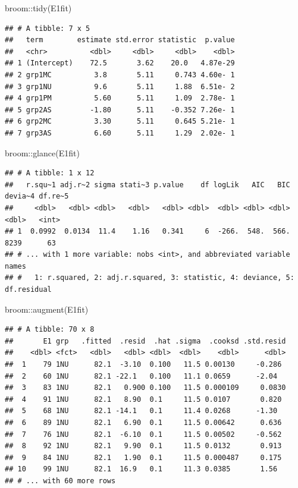 \documentclass[
]{book}
\newenvironment{Shaded}{\begin{snugshade}}{\end{snugshade}}
\newcommand{\FunctionTok}[1]{\textcolor[rgb]{0.00,0.00,0.00}{#1}}
\newcommand{\NormalTok}[1]{#1}
\newcommand{\SpecialCharTok}[1]{\textcolor[rgb]{0.00,0.00,0.00}{#1}}
\begin{document}
\begin{Shaded}
\begin{Highlighting}[]
\NormalTok{broom}\SpecialCharTok{::}\FunctionTok{tidy}\NormalTok{(E1fit)}
\end{Highlighting}
\end{Shaded}

\begin{verbatim}
## # A tibble: 7 x 5
##   term        estimate std.error statistic  p.value
##   <chr>          <dbl>     <dbl>     <dbl>    <dbl>
## 1 (Intercept)    72.5       3.62    20.0   4.87e-29
## 2 grp1MC          3.8       5.11     0.743 4.60e- 1
## 3 grp1NU          9.6       5.11     1.88  6.51e- 2
## 4 grp1PM          5.60      5.11     1.09  2.78e- 1
## 5 grp2AS         -1.80      5.11    -0.352 7.26e- 1
## 6 grp2MC          3.30      5.11     0.645 5.21e- 1
## 7 grp3AS          6.60      5.11     1.29  2.02e- 1
\end{verbatim}

\begin{Shaded}
\begin{Highlighting}[]
\NormalTok{broom}\SpecialCharTok{::}\FunctionTok{glance}\NormalTok{(E1fit)}
\end{Highlighting}
\end{Shaded}

\begin{verbatim}
## # A tibble: 1 x 12
##   r.squ~1 adj.r~2 sigma stati~3 p.value    df logLik   AIC   BIC devia~4 df.re~5
##     <dbl>   <dbl> <dbl>   <dbl>   <dbl> <dbl>  <dbl> <dbl> <dbl>   <dbl>   <int>
## 1  0.0992  0.0134  11.4    1.16   0.341     6  -266.  548.  566.    8239      63
## # ... with 1 more variable: nobs <int>, and abbreviated variable names
## #   1: r.squared, 2: adj.r.squared, 3: statistic, 4: deviance, 5: df.residual
\end{verbatim}

\begin{Shaded}
\begin{Highlighting}[]
\NormalTok{broom}\SpecialCharTok{::}\FunctionTok{augment}\NormalTok{(E1fit)}
\end{Highlighting}
\end{Shaded}

\begin{verbatim}
## # A tibble: 70 x 8
##       E1 grp   .fitted  .resid  .hat .sigma  .cooksd .std.resid
##    <dbl> <fct>   <dbl>   <dbl> <dbl>  <dbl>    <dbl>      <dbl>
##  1    79 1NU      82.1  -3.10  0.100   11.5 0.00130     -0.286 
##  2    60 1NU      82.1 -22.1   0.100   11.1 0.0659      -2.04  
##  3    83 1NU      82.1   0.900 0.100   11.5 0.000109     0.0830
##  4    91 1NU      82.1   8.90  0.1     11.5 0.0107       0.820 
##  5    68 1NU      82.1 -14.1   0.1     11.4 0.0268      -1.30  
##  6    89 1NU      82.1   6.90  0.1     11.5 0.00642      0.636 
##  7    76 1NU      82.1  -6.10  0.1     11.5 0.00502     -0.562 
##  8    92 1NU      82.1   9.90  0.1     11.5 0.0132       0.913 
##  9    84 1NU      82.1   1.90  0.1     11.5 0.000487     0.175 
## 10    99 1NU      82.1  16.9   0.1     11.3 0.0385       1.56  
## # ... with 60 more rows
\end{verbatim}
\end{document}
